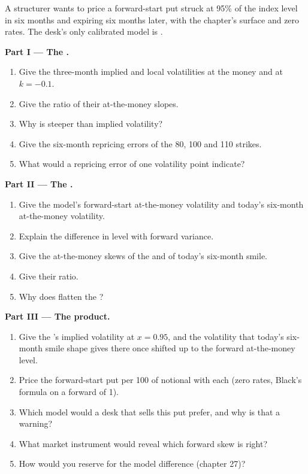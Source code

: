 \begin{problem}\label{pb:dv:local-volatility:1}
A structurer wants to price a forward-start put struck at 95\% of the index level in six months and expiring
six months later, with the chapter's surface and zero rates. The desk's only calibrated model is .

\medskip\noindent\textbf{Part I --- The .}
\begin{enumerate}
\item Give the three-month implied and local volatilities at the money and at $k=-0.1$.
\item Give the ratio of their at-the-money slopes.
\item Why is  steeper than implied volatility?
\item Give the six-month repricing errors of the 80, 100 and 110 strikes.
\item What would a repricing error of one volatility point indicate?
\end{enumerate}

\medskip\noindent\textbf{Part II --- The .}
\begin{enumerate}[resume]
\item Give the model's forward-start at-the-money volatility and today's six-month at-the-money volatility.
\item Explain the difference in level with forward variance.
\item Give the at-the-money skews of the  and of today's six-month smile.
\item Give their ratio.
\item Why does  flatten the ?
\end{enumerate}

\medskip\noindent\textbf{Part III --- The product.}
\begin{enumerate}[resume]
\item Give the 's implied volatility at $x=0.95$, and the volatility that today's six-month smile
shape gives there once shifted up to the forward at-the-money level.
\item Price the forward-start put per 100 of notional with each (zero rates, Black's formula on a forward of 1).
\item Which model would a desk that sells this put prefer, and why is that a warning?
\item What market instrument would reveal which forward skew is right?
\item How would you reserve for the model difference (chapter 27)?
\end{enumerate}


\end{problem}
